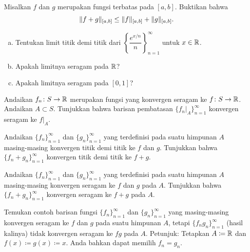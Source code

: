 \begin{exercise}
Misalkan $f$ dan $g$ merupakan fungsi terbatas pada $[a,b]$.  Buktikan bahwa
\begin{equation*}
\lVert {f+g} \rVert_{[a,b]} \leq \lVert {f} \rVert_{[a,b]} + \lVert {g} \rVert_{[a,b]} .
\end{equation*}
\end{exercise}

\begin{exercise}
\leavevmode
\begin{enumerate}[a)]
\item
Tentukan limit titik demi titik dari
$\left\{ \dfrac{e^{x/n}}{n} \right\}_{n=1}^\infty$ untuk $x \in {\mathbb{R}}$.
\item
Apakah limitnya seragam pada ${\mathbb{R}}$?
\item
Apakah limitnya seragam pada $[0,1]$?
\end{enumerate}
\end{exercise}

\begin{exercise}
Andaikan $f_n \colon S \to {\mathbb{R}}$ merupakan fungsi yang konvergen seragam
ke $f \colon S \to {\mathbb{R}}$.  Andaikan $A \subset S$.  Tunjukkan bahwa
barisan pembatasan $\{ f_n|_A \}_{n=1}^\infty$ konvergen seragam ke $f|_A$.
\end{exercise}

\begin{exercise}
Andaikan $\{ f_n \}_{n=1}^\infty$ dan $\{ g_n \}_{n=1}^\infty$ yang terdefinisi pada suatu himpunan $A$ masing-masing konvergen
titik demi titik ke $f$ dan $g$.  Tunjukkan bahwa $\{ f_n+g_n \}_{n=1}^\infty$ konvergen
titik demi titik ke $f+g$.
\end{exercise}

\begin{exercise}
Andaikan $\{ f_n \}_{n=1}^\infty$ dan $\{ g_n \}_{n=1}^\infty$ yang terdefinisi pada suatu himpunan $A$ masing-masing konvergen
seragam ke $f$ dan $g$ pada $A$.
Tunjukkan bahwa $\{ f_n+g_n \}_{n=1}^\infty$
konvergen seragam ke $f+g$ pada $A$.
\end{exercise}

\begin{exercise}
Temukan contoh barisan fungsi $\{ f_n \}_{n=1}^\infty$ dan
$\{ g_n \}_{n=1}^\infty$
yang masing-masing konvergen seragam ke $f$ dan $g$ pada suatu himpunan $A$, tetapi
$\{ f_ng_n \}_{n=1}^\infty$ (hasil kalinya) tidak konvergen seragam ke $fg$ pada $A$.
Petunjuk: Tetapkan $A \coloneqq {\mathbb{R}}$ dan $f(x)\coloneqq g(x) \coloneqq x$.  Anda bahkan dapat memilih $f_n = g_n$.
\end{exercise}

